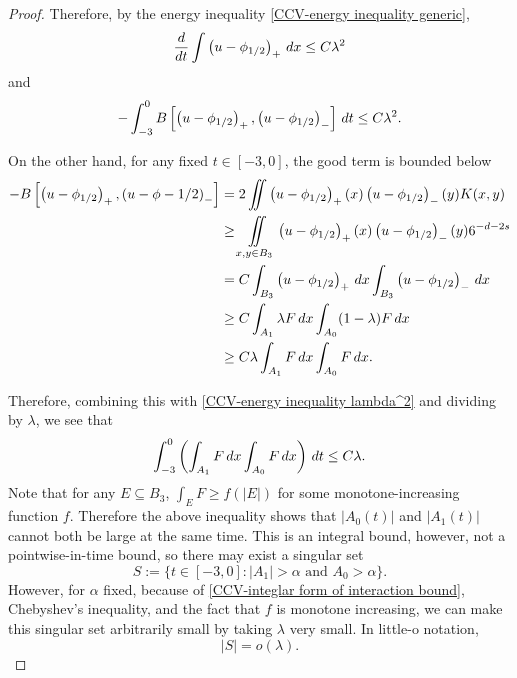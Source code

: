 \begin{proof}
Therefore, by the energy inequality \eqref{CCV-energy inequality generic}, 
\begin{equation} \label{CCV-derivative bound} \frac{d}{dt} \int \left( u-\phi_{1/2} \right)_+ \,dx \leq C \lambda^2 \end{equation}
and
\begin{equation} \label{CCV-energy inequality lambda^2}
- \int_{-3}^0 B\left[ \left( u-\phi_{1/2} \right)_+, \left( u-\phi_{1/2} \right)_- \right] \,dt \leq C \lambda^2.
\end{equation}

On the other hand, for any fixed $t \in [-3,0]$, the good term is bounded below
\begin{align*} 
-B\left[ \left( u-\phi_{1/2} \right)_+, \left( u-\phi-{1/2} \right)_- \right] &= 2 \iint \left( u-\phi_{1/2} \right)_+(x) \left( u-\phi_{1/2} \right)_-(y) K(x,y)
\\ & \geq \iint\limits_{x,y \in B_3} \left( u-\phi_{1/2} \right)_+(x) \left( u-\phi_{1/2} \right)_-(y) 6^{-d-2s}
\\ &= C \int_{B_3} \left( u-\phi_{1/2} \right)_+ \,dx \int_{B_3} \left( u-\phi_{1/2} \right)_- \,dx
\\ &\geq C \int_{A_1} \lambda F \,dx \int_{A_0} (1-\lambda) F \,dx
\\ &\geq C \lambda \int_{A_1} F \,dx \int_{A_0} F \,dx.
\end{align*}

Therefore, combining this with \eqref{CCV-energy inequality lambda^2} and dividing by $\lambda$, we see that
\begin{equation} \label{CCV-integlar form of interaction bound} \int_{-3}^0 \left(  \int_{A_1} F \,dx \int_{A_0} F \,dx  \right)\,dt \leq C \lambda. \end{equation}
Note that for any $E \subseteq B_3$, $\int_E F \geq f(|E|)$ for some monotone-increasing function $f$.%
Therefore the above inequality shows that $|A_0(t)|$ and $|A_1(t)|$ cannot both be large at the same time.  
This is an integral bound, however, not a pointwise-in-time bound, so there may exist a singular set
\[ S := \{ t \in [-3,0]: |A_1|>\alpha \textrm{ and } A_0 > \alpha\}. \]
However, for $\alpha$ fixed, because of \eqref{CCV-integlar form of interaction bound}, Chebyshev's inequality, and the fact that $f$ is monotone increasing, we can make this singular set arbitrarily small by taking $\lambda$ very small.  In little-o notation,
\begin{equation} \label{CCV-small measure of overlap} 
|S| = o(\lambda).
\end{equation}



\end{proof}

